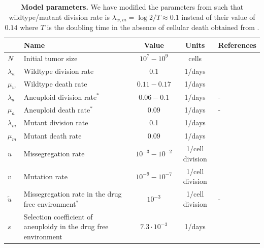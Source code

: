 \documentclass[12pt]{extarticle}
\begin{document}
\newpage
\begin{table}
\begin{center}
  \begin{tabular}{| l |p{5cm}| c | c | p{3cm} |}
    \hline
     & Name & Value & Units & References \\ \hline
    $N$ & Initial tumor size & $10^7-10^9$ & cells  & \citet{del2009does} \\ \hline
    $\lambda_w$ & Wildtype division rate& 0.1 & 1/days  & \citet{bozic2013evolutionary,rew2000cell} \\ \hline
    $\mu_w$ & Wildtype death rate& $0.11-0.17$ & 1/days  & \citet{bozic2013evolutionary} \\ \hline
    $\lambda_a$  & Aneuploid division rate$^\ast$ & $0.06-0.1$ & 1/days  & - \\ \hline
    $\mu_a$ & Aneuploid death rate$^\ast$ & $0.09$ & 1/days  & - \\ \hline
    $\lambda_m$ & Mutant division rate& 0.1 & 1/days  & \citet{bozic2013evolutionary,rew2000cell} \\ \hline
    $\mu_m$ & Mutant death rate& 0.09 & 1/days  & \citet{bozic2013evolutionary,carlson2003tumor} \\ \hline
    $u$ & Missegregation rate& $10^{-3}-10^{-2}$ & 1$\slash$cell division  & \citet{bakker2023predicting} \\ \hline
    $v$ & Mutation rate& $10^{-9}-10^{-7}$ &  1$\slash$cell division  & \citet{bozic2013evolutionary,loeb2001mutator} \\  \hline
    $\tilde{u}$ & Missegregation rate in the drug free environment$^\ast$& $10^{-3}$ & 1$\slash$cell division  & - \\ \hline
    $s$ & Selection coefficient of aneuploidy in the drug free environment& $7.3\cdot10^{-3}$ &  1/days   & \citet{lukow2021chromosomal} \\  
    \hline
  \end{tabular}
\caption{\textbf{Model parameters.} 
We have modified the parameters from \citet{bozic2013evolutionary} such that wildtype/mutant division rate is $\lambda_{w,m}=\log2/T\approx0.1$ instead of their value of $0.14$ where $T$ is the doubling time in the absence of cellular death obtained from \citet{rew2000cell}.}
  \label{table1}
\end{center}
\end{table}

\end{document}
